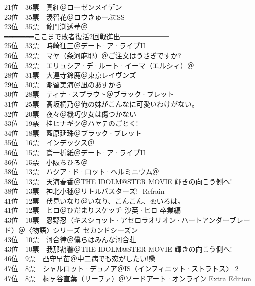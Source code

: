 {    21位　36票　真紅＠ローゼンメイデン\\
    23位　35票　湊智花＠ロウきゅーぶ!SS\\
    23位　35票　龍門渕透華＠\Saki\\
    ━━━━━━━ここまで敗者復活2回戦進出━━━━━━━\\
    25位　33票　時崎狂三＠デート·ア·ライブII\\
    26位　32票　マヤ（条河麻耶）＠ご注文はうさぎですか?\\
    26位　32票　エリュシア·デ·ルート·イーマ（エルシィ）＠\Kaminomi\\
    28位　31票　大連寺鈴鹿＠東京レイヴンズ\\
    29位　30票　潮留美海＠凪のあすから\\
    30位　28票　ティナ·スプラウト＠ブラック·ブレット\\
    31位　25票　高坂桐乃＠俺の妹がこんなに可愛いわけがない。\\
    32位　20票　夜々＠機巧少女は傷つかない\\
    33位　19票　桂ヒナギク＠ハヤテのごとく!\\
    34位　18票　藍原延珠＠ブラック·ブレット\\
    35位　16票　インデックス＠\Railgan\\
    36位　15票　鳶一折紙＠デート·ア·ライブII\\
    36位　15票　小阪ちひろ＠\Kaminomi\\
    38位　13票　ハクア·ド·ロット·ヘルミニウム＠\Kaminomi\\
    38位　13票　天海春香＠THE IDOLM@STER MOVIE 輝きの向こう側へ!\\
    38位　13票　神北小毬＠リトルバスターズ! -Refrain-\\
    41位　12票　伏見いなり＠いなり、こんこん、恋いろは。\\
    41位　12票　ヒロ＠ひだまりスケッチ 沙英·ヒロ 卒業編\\
    43位　10票　忍野忍（キスショット·アセロラオリオン·ハートアンダーブレード）＠〈物語〉シリーズ セカンドシーズン\\
    43位　10票　河合律＠僕らはみんな河合荘\\
    43位　10票　我那覇響＠THE IDOLM@STER MOVIE 輝きの向こう側へ!\\
    46位　9票　凸守早苗＠中二病でも恋がしたい!戀\\
    47位　8票　シャルロット·デュノア＠IS〈インフィニット·ストラトス〉 2\\
    47位　8票　桐ヶ谷直葉（リーファ）＠ソードアート·オンライン Extra Edition\\
}
